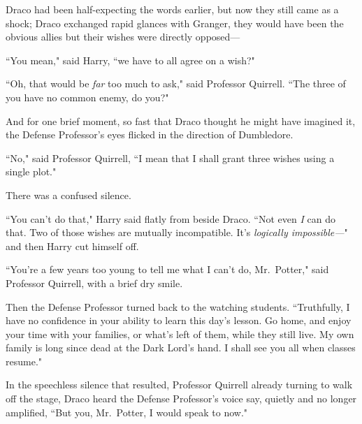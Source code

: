 Draco had been half-expecting the words earlier, but now they still came as a shock; Draco exchanged rapid glances with Granger, they would have been the obvious allies but their wishes were directly opposed—

``You mean," said Harry, ``we have to all agree on a wish?"

``Oh, that would be \emph{far} too much to ask," said Professor Quirrell. ``The three of you have no common enemy, do you?"

And for one brief moment, so fast that Draco thought he might have imagined it, the Defense Professor's eyes flicked in the direction of Dumbledore.

``No," said Professor Quirrell, ``I mean that I shall grant three wishes using a single plot."

There was a confused silence.

``You can't do that," Harry said flatly from beside Draco. ``Not even \emph{I} can do that. Two of those wishes are mutually incompatible. It's \emph{logically impossible—}" and then Harry cut himself off.

``You're a few years too young to tell me what I can't do, Mr.~Potter," said Professor Quirrell, with a brief dry smile.

Then the Defense Professor turned back to the watching students. ``Truthfully, I have no confidence in your ability to learn this day's lesson. Go home, and enjoy your time with your families, or what's left of them, while they still live. My own family is long since dead at the Dark Lord's hand. I shall see you all when classes resume."

In the speechless silence that resulted, Professor Quirrell already turning to walk off the stage, Draco heard the Defense Professor's voice say, quietly and no longer amplified, ``But you, Mr.~Potter, I would speak to now."

